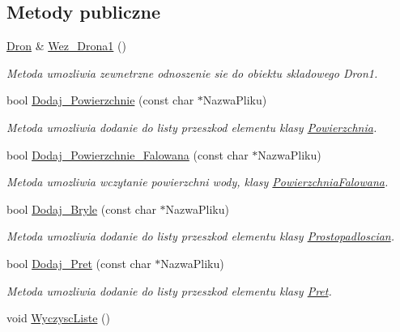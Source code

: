 \subsection*{Metody publiczne}
\begin{DoxyCompactItemize}
\item 
\hyperlink{classDron}{Dron} \& \hyperlink{classScena_af1091cf596813b9bfd9988296098fb72}{Wez\+\_\+\+Drona1} ()
\begin{DoxyCompactList}\small\item\em Metoda umozliwia zewnetrzne odnoszenie sie do obiektu skladowego Dron1. \end{DoxyCompactList}\item 
bool \hyperlink{classScena_ab26c6debc2e4671ea62af02f42e2e16d}{Dodaj\+\_\+\+Powierzchnie} (const char $\ast$Nazwa\+Pliku)
\begin{DoxyCompactList}\small\item\em Metoda umozliwia dodanie do listy przeszkod elementu klasy \hyperlink{classPowierzchnia}{Powierzchnia}. \end{DoxyCompactList}\item 
bool \hyperlink{classScena_ab569c96c91809528437fa573ae21e9f7}{Dodaj\+\_\+\+Powierzchnie\+\_\+\+Falowana} (const char $\ast$Nazwa\+Pliku)
\begin{DoxyCompactList}\small\item\em Metoda umozliwia wczytanie powierzchni wody, klasy \hyperlink{classPowierzchniaFalowana}{Powierzchnia\+Falowana}. \end{DoxyCompactList}\item 
bool \hyperlink{classScena_a62a362fa6ff9abdfe81332546513ada8}{Dodaj\+\_\+\+Bryle} (const char $\ast$Nazwa\+Pliku)
\begin{DoxyCompactList}\small\item\em Metoda umozliwia dodanie do listy przeszkod elementu klasy \hyperlink{classProstopadloscian}{Prostopadloscian}. \end{DoxyCompactList}\item 
bool \hyperlink{classScena_a8c12fed91688fae5d233916590a4491d}{Dodaj\+\_\+\+Pret} (const char $\ast$Nazwa\+Pliku)
\begin{DoxyCompactList}\small\item\em Metoda umozliwia dodanie do listy przeszkod elementu klasy \hyperlink{classPret}{Pret}. \end{DoxyCompactList}\item 
void \hyperlink{classScena_a39bb68f2653e88942d49b52d0aa7da4d}{Wyczysc\+Liste} ()

\end{DoxyCompactItemize}
